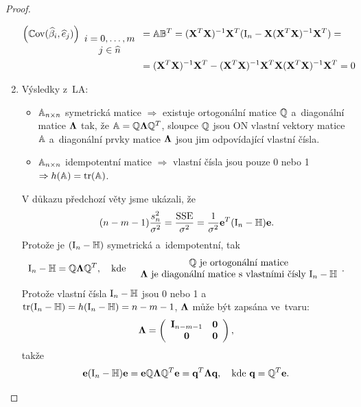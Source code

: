 \begin{proof}
\begin{enumerate}
 \begin{align*}
 \left(\mathbb{C}\mathrm{ov}(\widehat{\beta}_i, \widehat{e}_j) \right)_{ \begin{array}{c}
 i = 0,\dots, m \\
 j  \in\widehat{n}
 \end{array} } & = \mathbb{A} \mathbb{B}^T
 = (\mathbf{X}^T \mathbf{X})^{-1} \mathbf{X}^T (\text{I}_n - \mathbf{X} (\mathbf{X}^T \mathbf{X})^{-1} \mathbf{X}^T) = \\
& = (\mathbf{X}^T \mathbf{X})^{-1} \mathbf{X}^T - (\mathbf{X}^T \mathbf{X})^{-1} \mathbf{X}^T \mathbf{X} (\mathbf{X}^T \mathbf{X})^{-1} \mathbf{X}^T = 0
 \end{align*}
 
\item Výsledky z~LA:
\begin{itemize}
\item $\mathbb{A}_{n \times n}$ symetrická matice $\Rightarrow$ existuje ortogonální matice $\mathbb{Q}$ a~diagonální matice $\mathbf{\Lambda}$ tak, že $\mathbb{A} = \mathbb{Q} \mathbf{\Lambda} \mathbb{Q}^T$, sloupce $\mathbb{Q}$ jsou ON vlastní vektory matice $\mathbb{A}$ a~diagonální prvky matice $\mathbf{\Lambda}$ jsou jim odpovídající vlastní čísla.
\item $\mathbb{A}_{n \times n}$ idempotentní matice $\Rightarrow$ vlastní čísla jsou pouze 0 nebo 1 $\Rightarrow h(\mathbb{A}) = \text{tr}(\mathbb{A})$.
\end{itemize}
V důkazu předchozí věty jsme ukázali, že
$$(n - m -1) \frac{s_n^2}{\sigma^2} = \frac{\mathrm{SSE}}{\sigma^2} = \frac{1}{\sigma^2} \mathbf{e}^T (\text{I}_n - \mathbb{H}) \mathbf{e}.$$
Protože je $(\text{I}_n - \mathbb{H})$ symetrická a~idempotentní, tak
 $$
 \text{I}_n - \mathbb{H} = \mathbb{Q} \mathbf{\Lambda} \mathbb{Q}^T,  \quad \text{kde} \quad
 \begin{array}{c}
 {\mathbb{Q}\text{ je ortogonální matice}} \\
{\mathbf{\Lambda}  \text{ je diagonální matice s~vlastními čísly } \text{I}_n - \mathbb{H}}
 \end{array}.
 $$
Protože vlastní čísla $\text{I}_n - \mathbb{H}$ jsou 0 nebo 1 a~$\text{tr}(\text{I}_n - \mathbb{H}) = h(\text{I}_n - \mathbb{H}) = n - m - 1$, \linebreak
 $\mathbf{\Lambda}$ může být zapsána ve~tvaru:
 $$
 \mathbf{\Lambda} = 
 \left(\begin{array}{cc}
 \textbf{I}_{n-m-1} & \boldsymbol{0}  \\
 \boldsymbol{0} & \boldsymbol{0}
 \end{array} \right),
 $$
takže
 $$
 \mathbf{e} (\text{I}_n - \mathbb{H}) \mathbf{e} = \mathbf{e} \mathbb{Q} \mathbf{\Lambda} \mathbb{Q}^T \mathbf{e} = \textbf{q}^T \mathbf{\Lambda} \textbf{q}, \quad \text{kde } \textbf{q} = \mathbb{Q}^T \mathbf{e}.
 $$
 

\end{enumerate}
\end{proof}
